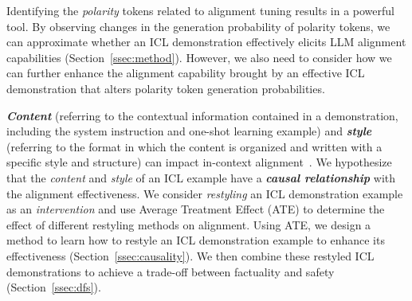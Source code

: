 Identifying the \emph{polarity} tokens related to alignment tuning results in a powerful tool. 
By observing changes in the generation probability of polarity tokens, we can approximate whether an ICL demonstration effectively elicits LLM alignment capabilities (Section~\ref{ssec:method}). 
However, we also need to consider how we can further enhance the alignment capability brought by an effective ICL demonstration that alters polarity token generation probabilities.

\textbf{\emph{Content}} (referring to the contextual information contained in a demonstration, including the system instruction and one-shot learning example) and \textbf{\emph{style}} (referring to the format in which the content is organized and written with a specific style and structure) can impact in-context alignment~\citep{DBLP:journals/corr/abs-2406-11474}.
We hypothesize that the \emph{content} and \emph{style} of an ICL example have a \textbf{\emph{causal relationship}} with the alignment effectiveness.
We consider \emph{restyling} an ICL demonstration example as an \emph{intervention} and use Average Treatment Effect (ATE) to determine the effect of different restyling methods on alignment. Using ATE, we design a method to learn how to restyle an ICL demonstration example to enhance its effectiveness (Section~\ref{ssec:causality}). 
We then combine these restyled ICL demonstrations to achieve a trade-off between factuality and safety (Section~\ref{ssec:dfs}).

